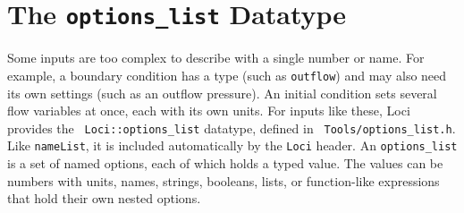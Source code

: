 \section {The {\tt options\_list} Datatype}
%
Some inputs are too complex to describe with a single number or name.
For example, a boundary condition has a type (such as {\tt outflow})
and may also need its own settings (such as an outflow pressure).  An
initial condition sets several flow variables at once, each with its
own units.  For inputs like these, Loci provides the {\tt
  Loci::options\_list} datatype, defined in {\tt
  Tools/options\_list.h}.  Like {\tt nameList}, it is included
automatically by the {\tt Loci} header.  An {\tt options\_list} is a
set of named options, each of which holds a typed value.  The values
can be numbers with units, names, strings, booleans, lists, or
function-like expressions that hold their own nested options.
%
